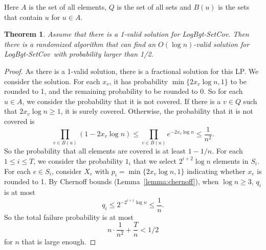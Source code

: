 \documentclass[11pt,a4paper]{article} \usepackage{enumitem}
\newcommand{\LBOsetcov}{\textsf{LogBgt-SetCov}}
\newtheorem{theorem}{Theorem}[section]
\theoremstyle{definition}
\begin{document}
Here $A$ is the set of all elements, $Q$ is the set of all sets and $B(u)$ is the sets that contain $u$ for $u\in A$.

\begin{theorem}
\label{thm:setcover}
Assume that there is a 1-valid solution for \LBOsetcov. Then there is a randomized algorithm that can find an $O(\log n)$-valid solution for \LBOsetcov\ with probability larger than 1/2. 
\end{theorem}

\begin{proof}
As there is a 1-valid solution, there is a fractional solution for this LP. We consider the solution. For each $x_v$, it has probability $\min\{2x_v\log n, 1\}$ to be rounded to 1, and the remaining probability to be rounded to 0. So for each $u\in A$, we consider the probability that it is not covered. If there is a $v\in Q$ such that $2x_v\log n\geq 1$, it is surely covered. Otherwise, the probability that it is not covered is
$$\prod_{v\in B(u)}(1-2x_v\log n)\leq \prod_{v\in B(u)}e^{-2x_v\log n}\leq \frac{1}{n^2}.$$
So the probability that all elements are covered is at least $1-1/n$. For each $1\leq i\leq T$, we consider the probability $1_i$ that we select $2^{i+2}\log n$ elements in $S_i$. For each $e\in S_i$, consider $X_e$ with $p_i=\min\{2x_v\log n, 1\}$ indicating whether $x_e$ is rounded to 1. By Chernoff bounds (Lemma~\ref{lemma:chernoff}), when $\log n\geq 3$, $q_i$ is at most
$$q_i\leq 2^{-2^{i+1}\log n}\leq \frac{1}{n}.$$
So the total failure probability is at most
$$n\cdot\frac{1}{n^2}+\frac{T}{n}<1/2$$
for $n$ that is large enough.
\end{proof}
\newpage
%
 
\end{document}
